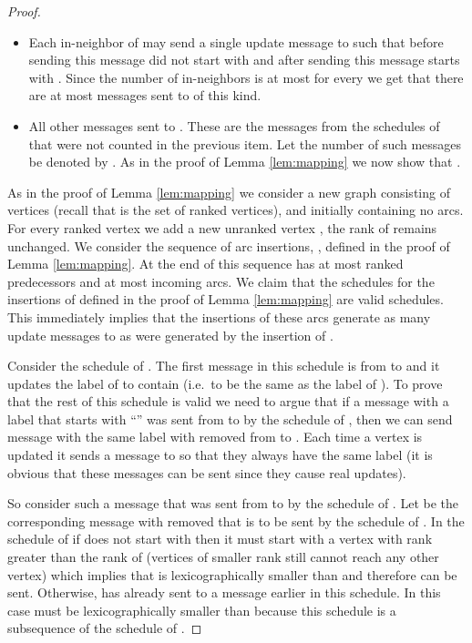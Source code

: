 \documentclass[11pt]{article}
\theoremstyle{plain}
\theoremstyle{definition}
\theoremstyle{remark}
\numberwithin{equation}{section}
\begin{document}
\begin{proof}
\begin{itemize}
    \item Each in-neighbor  of  may send  a single update
    message to  such that before sending this message 
    did not start with  and after sending this message 
starts with
    . Since the number of in-neighbors
    is at most  for every  we get that there are
    at most  messages sent to  of this kind.


    \item \label{split:hard2} All other messages sent to . These are the messages from the schedules of
     that were not counted in the previous item. Let the number of such messages be denoted by . As in the proof of Lemma \ref{lem:mapping} we now show that
    .
  \end{itemize}


As in the proof of Lemma \ref{lem:mapping} we consider a new graph
consisting of  vertices (recall that  is the set of
ranked vertices), and initially containing no arcs. For every ranked
vertex  we add a new unranked vertex , the rank of 
remains unchanged. We consider the sequence of arc insertions,
,  defined in the proof of Lemma \ref{lem:mapping}. At the end
of this sequence  has at most  ranked
predecessors and at most  incoming arcs. We claim
that the schedules for the insertions of  defined in the
proof of Lemma \ref{lem:mapping} are valid schedules. This
immediately implies that the insertions of these arcs generate as
many update messages to  as were generated by the insertion of
.

Consider the schedule of . The first message in this
schedule is from  to  and it updates the label of 
to contain  (i.e.\ to be the same as the label of ).
 To prove that the rest of this schedule  is
valid  we need to argue that if a message with a label  that
starts with ``'' was sent from  to  by the
schedule of , then we can send message with the same label
with  removed from  to . Each time a vertex  is
updated it sends a message to  so that they always have the same
label (it is obvious that these messages can be sent since they
cause real updates).

So consider such a message  that was sent from  to  by
the schedule of . Let  be the corresponding message
with  removed that is to be sent by the schedule of
.  In the schedule of  if
  does not start with  then it
must start with a vertex with rank greater than the rank of 
(vertices of smaller rank still cannot reach any other vertex) which
implies that  is lexicographically smaller than
 and therefore  can be sent. Otherwise, 
has already sent to  a message earlier in this schedule. In this
case  must be lexicographically smaller than 
because this schedule is a subsequence of the schedule of
.
\end{proof}







\end{document}
